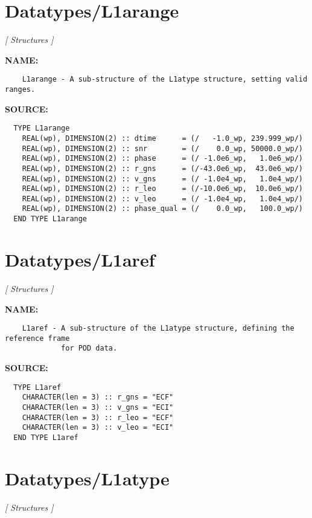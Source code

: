 \section{Datatypes/L1arange}
\textsl{[ Structures ]}

\label{ch:robo30}
\label{ch:Datatypes_L1arange}
\textbf{NAME:}\hspace{0.08in}\begin{Verbatim}
    L1arange - A sub-structure of the L1atype structure, setting valid ranges.
\end{Verbatim}
\textbf{SOURCE:}\hspace{0.08in}\begin{Verbatim}
  TYPE L1arange
    REAL(wp), DIMENSION(2) :: dtime      = (/   -1.0_wp, 239.999_wp/)
    REAL(wp), DIMENSION(2) :: snr        = (/    0.0_wp, 50000.0_wp/)
    REAL(wp), DIMENSION(2) :: phase      = (/ -1.0e6_wp,   1.0e6_wp/)
    REAL(wp), DIMENSION(2) :: r_gns      = (/-43.0e6_wp,  43.0e6_wp/)
    REAL(wp), DIMENSION(2) :: v_gns      = (/ -1.0e4_wp,   1.0e4_wp/)
    REAL(wp), DIMENSION(2) :: r_leo      = (/-10.0e6_wp,  10.0e6_wp/)
    REAL(wp), DIMENSION(2) :: v_leo      = (/ -1.0e4_wp,   1.0e4_wp/)
    REAL(wp), DIMENSION(2) :: phase_qual = (/    0.0_wp,   100.0_wp/)
  END TYPE L1arange
\end{Verbatim}
\section{Datatypes/L1aref}
\textsl{[ Structures ]}

\label{ch:robo31}
\label{ch:Datatypes_L1aref}
\textbf{NAME:}\hspace{0.08in}\begin{Verbatim}
    L1aref - A sub-structure of the L1atype structure, defining the reference frame
             for POD data.
\end{Verbatim}
\textbf{SOURCE:}\hspace{0.08in}\begin{Verbatim}
  TYPE L1aref
    CHARACTER(len = 3) :: r_gns = "ECF"
    CHARACTER(len = 3) :: v_gns = "ECI"
    CHARACTER(len = 3) :: r_leo = "ECF"
    CHARACTER(len = 3) :: v_leo = "ECI"
  END TYPE L1aref
\end{Verbatim}
\section{Datatypes/L1atype}
\textsl{[ Structures ]}

